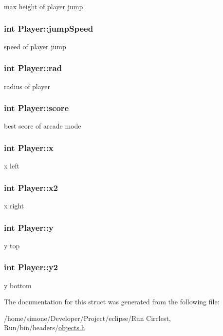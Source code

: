 max height of player jump \hypertarget{struct_player_ae31361d3bdc51dac6d3211e399adab9c}{
\subsubsection[{jump\-Speed}]{\setlength{\rightskip}{0pt plus 5cm}int Player\-::jump\-Speed}}\label{struct_player_ae31361d3bdc51dac6d3211e399adab9c}
speed of player jump \hypertarget{struct_player_a46954cec62184c555fcdffc529952d92}{
\subsubsection[{rad}]{\setlength{\rightskip}{0pt plus 5cm}int Player\-::rad}}\label{struct_player_a46954cec62184c555fcdffc529952d92}
radius of player \hypertarget{struct_player_ace6abae8d66534ad0a1fd6458f786a6e}{
\subsubsection[{score}]{\setlength{\rightskip}{0pt plus 5cm}int Player\-::score}}\label{struct_player_ace6abae8d66534ad0a1fd6458f786a6e}
best score of arcade mode \hypertarget{struct_player_ad285b3cb25e4a46ca944b9a416c1b13f}{
\subsubsection[{x}]{\setlength{\rightskip}{0pt plus 5cm}int Player\-::x}}\label{struct_player_ad285b3cb25e4a46ca944b9a416c1b13f}
x left \hypertarget{struct_player_a1797ea6961b6f705f2e0c7244c73f755}{
\subsubsection[{x2}]{\setlength{\rightskip}{0pt plus 5cm}int Player\-::x2}}\label{struct_player_a1797ea6961b6f705f2e0c7244c73f755}
x right \hypertarget{struct_player_a6da29d6e3783c6028c92647bbde478f5}{
\subsubsection[{y}]{\setlength{\rightskip}{0pt plus 5cm}int Player\-::y}}\label{struct_player_a6da29d6e3783c6028c92647bbde478f5}
y top \hypertarget{struct_player_a95e8a1142710c7760b2a1bd7cade9c5c}{
\subsubsection[{y2}]{\setlength{\rightskip}{0pt plus 5cm}int Player\-::y2}}\label{struct_player_a95e8a1142710c7760b2a1bd7cade9c5c}
y bottom 

The documentation for this struct was generated from the following file\-:\begin{DoxyCompactItemize}
\item 
/home/simone/\-Developer/\-Project/eclipse/\-Run Circlest, Run/bin/headers/\hyperlink{objects_8h}{objects.\-h}\end{DoxyCompactItemize}
